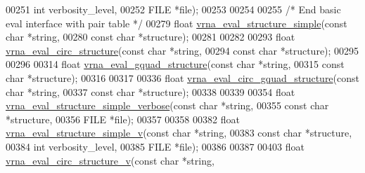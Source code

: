 \begin{DoxyCode}
00251                              \textcolor{keywordtype}{int}                  verbosity\_level,
00252                              FILE                 *file);
00253 
00254 
00255 \textcolor{comment}{/* End basic eval interface with pair table */}
00279 \textcolor{keywordtype}{float} \hyperlink{group__eval_ga7e5273464b775d4130245681312c1369}{vrna\_eval\_structure\_simple}(\textcolor{keyword}{const} \textcolor{keywordtype}{char} *\textcolor{keywordtype}{string},
00280                                  \textcolor{keyword}{const} \textcolor{keywordtype}{char} *structure);
00281 
00282 
00293 \textcolor{keywordtype}{float} \hyperlink{group__eval_ga3e05a23ddf9b083f4e69881e440d4866}{vrna\_eval\_circ\_structure}(\textcolor{keyword}{const} \textcolor{keywordtype}{char} *\textcolor{keywordtype}{string},
00294                                \textcolor{keyword}{const} \textcolor{keywordtype}{char} *structure);
00295 
00296 
00314 \textcolor{keywordtype}{float} \hyperlink{group__eval_ga3263504825ef4b523eba797c99921df4}{vrna\_eval\_gquad\_structure}(\textcolor{keyword}{const} \textcolor{keywordtype}{char}  *\textcolor{keywordtype}{string},
00315                                 \textcolor{keyword}{const} \textcolor{keywordtype}{char}  *structure);
00316 
00317 
00336 \textcolor{keywordtype}{float} \hyperlink{group__eval_ga9dba2fc5d7e6ad1359a7c2f350589c0e}{vrna\_eval\_circ\_gquad\_structure}(\textcolor{keyword}{const} \textcolor{keywordtype}{char} *\textcolor{keywordtype}{string},
00337                                      \textcolor{keyword}{const} \textcolor{keywordtype}{char} *structure);
00338 
00339 
00354 \textcolor{keywordtype}{float} \hyperlink{group__eval_gaf928bfd96767e1b8033a95a4cc432e39}{vrna\_eval\_structure\_simple\_verbose}(\textcolor{keyword}{const} \textcolor{keywordtype}{char} *\textcolor{keywordtype}{string},
00355                                          \textcolor{keyword}{const} \textcolor{keywordtype}{char} *structure,
00356                                          FILE       *file);
00357 
00358 
00382 \textcolor{keywordtype}{float} \hyperlink{group__eval_gacd6278343e77d13f1d53588e50d303bc}{vrna\_eval\_structure\_simple\_v}(\textcolor{keyword}{const} \textcolor{keywordtype}{char} *\textcolor{keywordtype}{string},
00383                                    \textcolor{keyword}{const} \textcolor{keywordtype}{char} *structure,
00384                                    \textcolor{keywordtype}{int}        verbosity\_level,
00385                                    FILE       *file);
00386 
00387 
00403 \textcolor{keywordtype}{float} \hyperlink{group__eval_gac3fb44e0773a51be8efc5f4f595a94a7}{vrna\_eval\_circ\_structure\_v}(\textcolor{keyword}{const} \textcolor{keywordtype}{char} *\textcolor{keywordtype}{string},

\end{DoxyCode}
